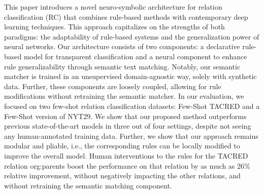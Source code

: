 This paper introduces a novel neuro-symbolic architecture for relation classification (RC) that combines rule-based methods with contemporary deep learning techniques.  This approach capitalizes on the strengths of both paradigms: the adaptability of rule-based systems and the generalization power of neural networks. Our architecture consists of two components: a declarative rule-based model for transparent classification and a neural component to enhance rule generalizability through semantic text matching. Notably, our semantic matcher is trained in an unsupervised domain-agnostic way, solely with synthetic data. Further, these components are loosely coupled, allowing for rule modifications without retraining the semantic matcher. In our evaluation, we focused on two few-shot relation classification datasets: Few-Shot TACRED and a Few-Shot version of NYT29.  We show that our proposed method outperforms previous state-of-the-art models in three out of four settings, despite not seeing any human-annotated training data. Further, we show that our approach remains modular and pliable, i.e., the corresponding rules can be locally modified to improve the overall model. Human interventions to the rules for the TACRED relation org:parents boost the performance on that relation by as much as 26\% relative improvement, without negatively impacting the other relations, and without retraining the semantic matching component.